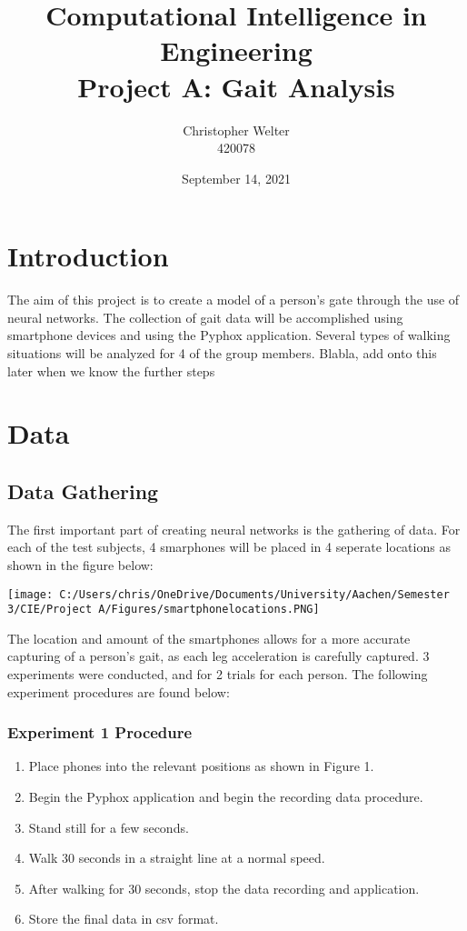 \documentclass[10pt]{article}
\title{Computational Intelligence in Engineering\\Project A: Gait Analysis}
\author{Christopher Welter\\420078}
\date{September 14, 2021}
\begin{document}
\maketitle

\section{Introduction}

The aim of this project is to create a model of a person's gate through the use of neural networks. The collection of gait data will be accomplished using smartphone devices and using the Pyphox application. Several types of walking situations will be analyzed for 4 of the group members. Blabla, add onto this later when we know the further steps

\section{Data}
\subsection{Data Gathering}

The first important part of creating neural networks is the gathering of data. For each of the test subjects, 4 smarphones will be placed in 4 seperate locations as shown in the figure below:

\begin{center}
\texttt{[image: C:/Users/chris/OneDrive/Documents/University/Aachen/Semester 3/CIE/Project A/Figures/smartphonelocations.PNG]}
\end{center}

The location and amount of the smartphones allows for a more accurate capturing of a person's gait, as each leg acceleration is carefully captured. 3 experiments were conducted, and for 2 trials for each person. The following experiment procedures are found below:

\subsubsection{Experiment 1 Procedure}
\begin{enumerate}
\item Place phones into the relevant positions as shown in Figure 1.
\item Begin the Pyphox application and begin the recording data procedure.
\item Stand still for a few seconds.
\item Walk 30 seconds in a straight line at a normal speed.
\item After walking for 30 seconds, stop the data recording and application.
\item Store the final data in csv format.
\end{enumerate}
\end{document}
